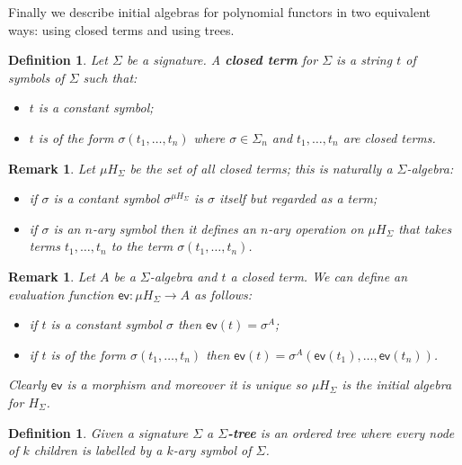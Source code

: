 \documentclass[letterpaper, 11pt, oneside]{memoir}
\theoremstyle{myteo}
\newtheorem{definition}[theorem]{Definition}
\newtheorem{remark}[theorem]{Remark}
\numberwithin{equation}{section}
\newcommand{\marginnote}[1]{\marginpar{\footnotesize #1}}
\begin{document}
Finally we describe initial algebras for polynomial functors in two equivalent ways: using closed terms and using trees.

\begin{definition}
  Let \(\Sigma\) be a signature.
  A \textbf{closed term} for \(\Sigma\) is a string \(t\) of symbols of \(\Sigma\) such that:
  \marginnote{closed term}
  \begin{itemize}
  \item[1.] \(t\) is a constant symbol;
  \item[2.] \(t\) is of the form \(\sigma(t_1, \ldots, t_n)\) where \(\sigma \in \Sigma_n\) and \(t_1, \ldots, t_n\) are closed terms.
  \end{itemize}
\end{definition}

\begin{remark}
  Let \(\mu H_\Sigma\) be the set of all closed terms; this is naturally a \(\Sigma\)-algebra:
  \begin{itemize}
  \item[1.] if \(\sigma\) is a contant symbol \(\sigma^{\mu H_\Sigma}\) is \(\sigma\) itself but regarded as a term;
  \item[2.] if \(\sigma\) is an \(n\)-ary symbol then it defines an \(n\)-ary operation on \(\mu H_\Sigma\) that takes terms \(t_1, \ldots, t_n\) to the term \(\sigma(t_1, \ldots, t_n)\).
  \end{itemize}
\end{remark}

\begin{remark}
  \label{rem:ev_function}
  Let \(A\) be a \(\Sigma\)-algebra and \(t\) a closed term.
  We can define an evaluation function \(\textsf{ev} \colon \mu H_\Sigma \to A\) as follows:
  \begin{itemize}
  \item[1.] if \(t\) is a constant symbol \(\sigma\) then \(\textsf{ev}(t) = \sigma^A\);
  \item[2.] if \(t\) is of the form \(\sigma(t_1, \ldots, t_n)\) then \(\textsf{ev}(t) = \sigma^A(\textsf{ev}(t_1), \ldots, \textsf{ev}(t_n))\).
  \end{itemize}
  Clearly \(\textsf{ev}\) is a morphism and moreover it is unique so \(\mu H_\Sigma\) is the initial algebra for \(H_\Sigma\).
\end{remark}

\begin{definition}
  Given a signature \(\Sigma\) a \textbf{\(\Sigma\)-tree} is an ordered tree where every node of \(k\) children is labelled by a \(k\)-ary symbol of \(\Sigma\).
\end{definition}
\end{document}

